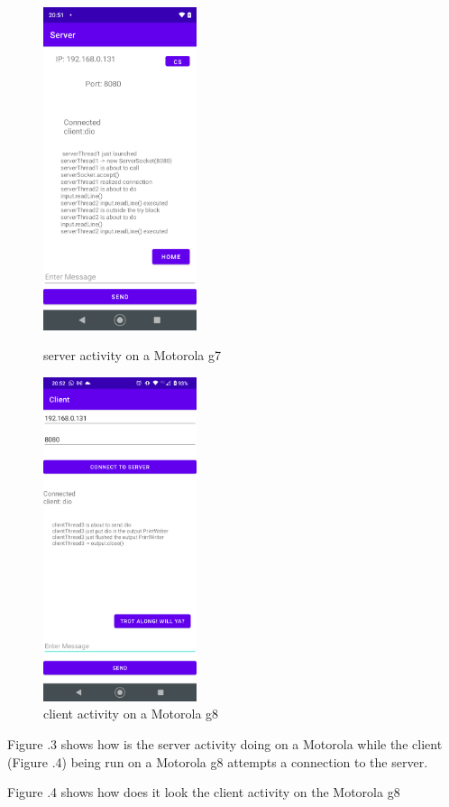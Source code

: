 \documentclass[a4paper,12pt]{article}
\begin{document}
\clearpage

\begin{figure}
\includegraphics[width=4.5cm]{./server_g7.PNG}
\caption{server activity on a Motorola g7}\label{wrap-fig:3}
\includegraphics[width=4.5cm]{./client_g8.PNG}
\caption{client activity on a Motorola g8}\label{wrap-fig:4}
\end{figure}
Figure .3 shows how is the server activity doing on a Motorola while the client (Figure .4) being run on a Motorola g8 attempts a connection to the server. 

Figure .4 shows how does it look the client activity on the Motorola g8
\end{document}
